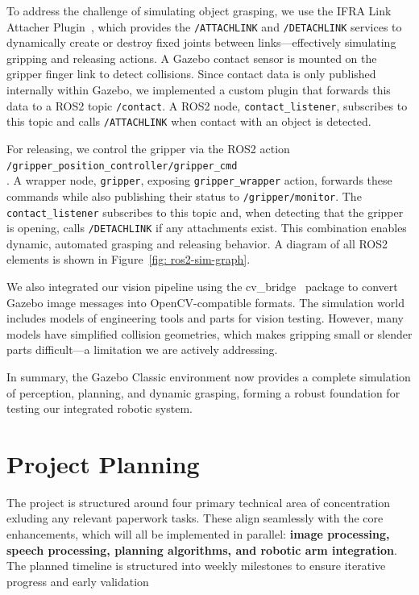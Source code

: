 \documentclass[12pt]{extarticle}
\begin{document}
To address the challenge of simulating object grasping, we use the IFRA Link Attacher Plugin~\cite{ifra_link_attacher}, which provides the \texttt{/ATTACHLINK} and \texttt{/DETACHLINK} services to dynamically create or destroy fixed joints between links—effectively simulating gripping and releasing actions. A Gazebo contact sensor is mounted on the gripper finger link to detect collisions. Since contact data is only published internally within Gazebo, we implemented a custom plugin that forwards this data to a ROS2 topic \texttt{/contact}. A ROS2 node, \texttt{contact\_listener}, subscribes to this topic and calls \texttt{/ATTACHLINK} when contact with an object is detected.

For releasing, we control the gripper via the ROS2 action\\\texttt{/gripper\_position\_controller/gripper\_cmd}\\. A wrapper node, \texttt{gripper}, exposing \texttt{gripper\_wrapper} action, forwards these commands while also publishing their status to \texttt{/gripper/monitor}. The \texttt{contact\_listener} subscribes to this topic and, when detecting that the gripper is opening, calls \texttt{/DETACHLINK} if any attachments exist. This combination enables dynamic, automated grasping and releasing behavior. A diagram of all ROS2 elements is shown in Figure~\ref{fig: ros2-sim-graph}.

We also integrated our vision pipeline using the cv\_bridge~\cite{cv_bridge} package to convert Gazebo image messages into OpenCV-compatible formats. The simulation world includes models of engineering tools and parts for vision testing. However, many models have simplified collision geometries, which makes gripping small or slender parts difficult—a limitation we are actively addressing.

In summary, the Gazebo Classic environment now provides a complete simulation of perception, planning, and dynamic grasping, forming a robust foundation for testing our integrated robotic system.

\newpage
\section{Project Planning}
The project is structured around four primary technical area of concentration exluding any relevant paperwork tasks. These align seamlessly with the core enhancements, which will all be implemented in parallel: \textbf{image processing, speech processing, planning algorithms, and robotic arm integration}.  The planned timeline is structured into weekly milestones to ensure iterative progress and early validation 
\end{document}
